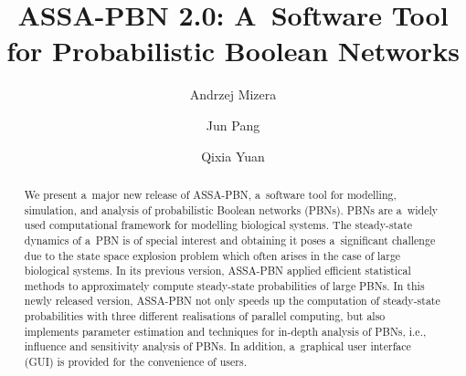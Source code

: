 \documentclass[runningheads,a4paper]{llncs}
\begin{document}
\mainmatter
\title{{\sf ASSA-PBN 2.0}: A~Software Tool\\ for Probabilistic Boolean Networks}


%

\author{Andrzej Mizera \and Jun Pang \and Qixia Yuan}


\maketitle
\begin{abstract}
We present a~major new release of {\sf ASSA-PBN}, a~software tool for modelling, simulation, and
analysis of probabilistic Boolean networks (PBNs). PBNs are a~widely used computational framework
for modelling biological systems. The steady-state dynamics of a~PBN is of special interest and
obtaining it poses a~significant challenge due to the state space explosion problem which often
arises in the case of large biological systems. In its previous version, {\sf ASSA-PBN} applied
efficient statistical methods to approximately compute steady-state probabilities of large PBNs.
In this newly released version, {\sf ASSA-PBN} not only speeds up the computation of
steady-state probabilities with three different realisations of parallel computing, but also
implements parameter estimation and techniques for in-depth analysis of PBNs, i.e., influence
and sensitivity analysis of PBNs. In addition, a~graphical user interface (GUI) is provided for
the convenience of users.

\end{abstract}
\end{document}
